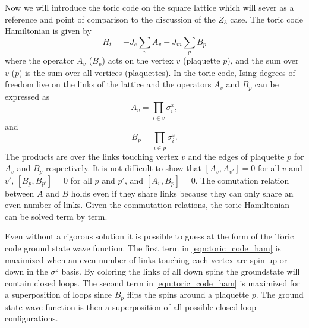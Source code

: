 \documentclass[twocolumn,prb,aps,floatfix,superscriptaddress]{revtex4-1}
\begin{document}
    Now we will introduce the toric code on the square lattice which will sever as a reference and
    point of comparison to the discussion of the $Z_3$ case. The toric code Hamiltonian is given by
    \begin{equation}
        H_t = -J_e\sum_v A_v - J_m\sum_p B_p
        \label{eqn:toric_code_ham}
    \end{equation}
    where the operator $A_v$ ($B_p$) acts on the vertex $v$ (plaquette $p$), and the sum over $v$ ($p$) 
    is the sum over all vertices (plaquettes). 
    In the toric code, Ising degrees of freedom live on the links of the
    lattice and the operators $A_v$ and $B_p$ can be expressed as
    \begin{equation}
        A_v = \prod_{i\in v} \sigma^x_i
        ,
    \end{equation}
    and
    \begin{equation}
        B_p = \prod_{i\in p} \sigma^z_i
        .
    \end{equation}
    The products are over the links touching vertex $v$ and the edges of plaquette $p$ for
    $A_v$ and $B_p$ respectively. It is not difficult to show that 
    $[A_v,A_{v'}]=0$ for all $v$ and $v'$, 
    $[B_p,B_{p'}]=0$ for all $p$ and $p'$, and $[A_v,B_p]=0$. The comutation relation between $A$
    and $B$ holds even if they share links because they
    can only share an even number of links. Given the commutation relations,
    the toric Hamiltonian can be solved term by term.

    Even without a rigorous solution it is possible to guess at the form of the Toric code
    ground state wave function. The first term in \ref{eqn:toric_code_ham} is maximized 
    when an even number of links touching each vertex are spin up or down in the
    $\sigma^z$ basis. By coloring the links of all down spins the groundstate will
    contain closed loops. The second term in \ref{eqn:toric_code_ham} is maximized for a
    superposition of loops since $B_p$ flips the spins around a plaquette $p$. The ground state
    wave function is then a superposition of all possible closed loop configurations. 
\end{document}

